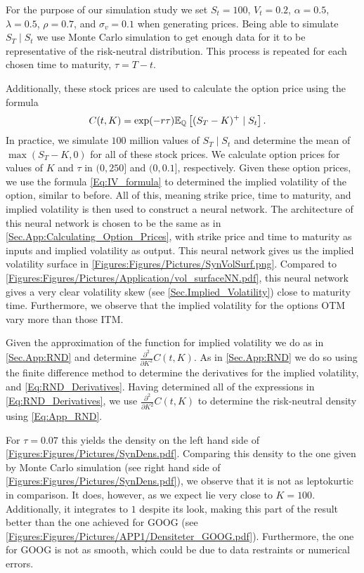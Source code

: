 For the purpose of our simulation study we set $S_t=100$, $V_t=0.2$, $\alpha=0.5$, $\lambda=0.5$, $\rho=0.7$, and $\sigma_v=0.1$ when generating prices. Being able to simulate $S_T\mid S_t$ we use Monte Carlo simulation \citep[p. 267]{Hull} to get enough data for it to be representative of the risk-neutral distribution. This process is repeated for each chosen time to maturity, $\tau=T-t$. 

Additionally, these stock prices are used to calculate the option price using the formula
\begin{align}
    C(t,K) &= \exp(-r\tau)\E[\Q]{(S_T-K)^+\mid S_t}.
\end{align}
In practice, we simulate $100$ million values of $S_T\mid S_t$ and determine the mean of $\max(S_T-K,0)$ for all of these stock prices. We calculate option prices for values of $K$ and $\tau$ in $(0,250]$ and $(0,0.1]$, respectively. Given these option prices, we use the formula \eqref{Eq:IV_formula} to determined the implied volatility of the option, similar to before. All of this, meaning strike price, time to maturity, and implied volatility is then used to construct a neural network. The architecture of this neural network is chosen to be the same as in \autoref{Sec.App:Calculating_Option_Prices}, with strike price and time to maturity as inputs and implied volatility as output. This neural network gives us the implied volatility surface in \autoref{Figures:Figures/Pictures/SynVolSurf.png}. Compared to \autoref{Figures:Figures/Pictures/Application/vol_surfaceNN.pdf}, this neural network gives a very clear volatility skew (see \autoref{Sec.Implied_Volatility}) close to maturity time. Furthermore, we observe that the implied volatility for the options OTM vary more than those ITM.


Given the approximation of the function for implied volatility we do as in \autoref{Sec.App:RND} and determine $\frac{\partial^2}{\partial K^2}C(t,K)$. As in \autoref{Sec.App:RND} we do so using the finite difference method to determine the derivatives for the implied volatility, and \eqref{Eq:RND_Derivatives}. Having determined all of the expressions in \eqref{Eq:RND_Derivatives}, we use $\frac{\partial^2}{\partial K^2}C(t,K)$ to determine the risk-neutral density using \eqref{Eq:App_RND}.

For $\tau=0.07$ this yields the density on the left hand side of \autoref{Figures:Figures/Pictures/SynDens.pdf}. Comparing this density to the one given by Monte Carlo simulation (see right hand side of \autoref{Figures:Figures/Pictures/SynDens.pdf}), we observe that it is not as leptokurtic in comparison. It does, however, as we expect lie very close to $K=100$. Additionally, it integrates to $1$ despite its look, making this part of the result better than the one achieved for GOOG (see \autoref{Figures:Figures/Pictures/APP1/Densiteter_GOOG.pdf}). Furthermore, the one for GOOG is not as smooth, which could be due to data restraints or numerical errors.

